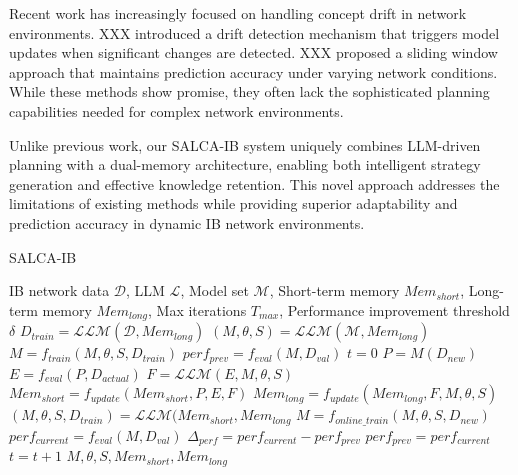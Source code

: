 \documentclass[conference]{IEEEtran}
\begin{document}
Recent work has increasingly focused on handling concept drift in network environments. XXX introduced a drift detection mechanism that triggers model updates when significant changes are detected. XXX proposed a sliding window approach that maintains prediction accuracy under varying network conditions. While these methods show promise, they often lack the sophisticated planning capabilities needed for complex network environments.

Unlike previous work, our SALCA-IB system uniquely combines LLM-driven planning with a dual-memory architecture, enabling both intelligent strategy generation and effective knowledge retention. This novel approach addresses the limitations of existing methods while providing superior adaptability and prediction accuracy in dynamic IB network environments.


\begin{algorithm}
\caption{SALCA-IB}
\label{alg:salca-ib}
\begin{algorithmic}[1]
\Require IB network data $\mathcal{D}$, LLM $\mathcal{L}$, Model set $\mathcal{M}$, Short-term memory $Mem_{short}$, Long-term memory $Mem_{long}$, Max iterations $T_{max}$, Performance improvement threshold $\delta$
\State $D_{train} = \mathcal{LLM}(\mathcal{D}, Mem_{long})$ 
\State $(M, \theta, S) = \mathcal{LLM}(\mathcal{M}, Mem_{long})$ 
\State $M = f_{train}(M, \theta, S, D_{train})$ 
\State $perf_{prev} = f_{eval}(M, D_{val})$ 
\State $t = 0$ 
    \State $P = M(D_{new})$ 
    \State $E = f_{eval}(P, D_{actual})$ 
    \State $F = \mathcal{LLM}(E, M, \theta, S)$ 
    \State $Mem_{short} = f_{update}(Mem_{short}, P, E, F)$ 
    \State $Mem_{long} = f_{update}(Mem_{long}, F, M, \theta, S)$
    \State $(M, \theta, S, D_{train}) = \mathcal{LLM}(Mem_{short}, Mem_{long}$ 
    \State $M = f_{online\_train}(M, \theta, S, D_{new})$ 
    \State $perf_{current} = f_{eval}(M, D_{val})$ 
    \State $\Delta_{perf} = perf_{current} - perf_{prev}$
    \State $perf_{prev} = perf_{current}$
    \State $t = t + 1$ 
\EndWhile
\State \Return $M, \theta, S, Mem_{short}, Mem_{long}$ 
\end{algorithmic}
\end{algorithm}
\end{document}
